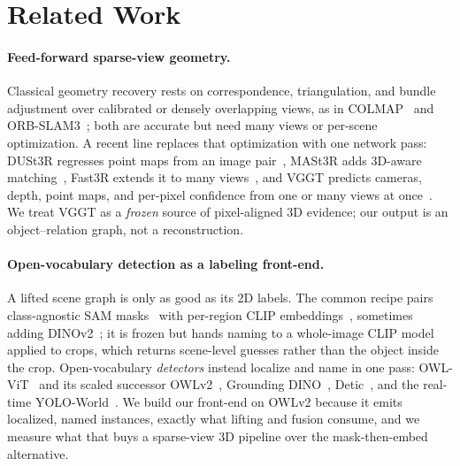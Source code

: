 \section{Related Work}
\label{sec:related_work}

\paragraph{Feed-forward sparse-view geometry.}
Classical geometry recovery rests on correspondence, triangulation, and bundle adjustment over calibrated or densely overlapping views, as in COLMAP~\cite{schonberger2016sfm} and ORB-SLAM3~\cite{campos2021orbslam3}; both are accurate but need many views or per-scene optimization. A recent line replaces that optimization with one network pass: DUSt3R regresses point maps from an image pair~\cite{wang2024dust3r}, MASt3R adds 3D-aware matching~\cite{leroy2024mast3r}, Fast3R extends it to many views~\cite{yang2025fast3r}, and VGGT predicts cameras, depth, point maps, and per-pixel confidence from one or many views at once~\cite{wang2025vggt}. We treat VGGT as a \emph{frozen} source of pixel-aligned 3D evidence; our output is an object--relation graph, not a reconstruction.

\paragraph{Open-vocabulary detection as a labeling front-end.}
A lifted scene graph is only as good as its 2D labels. The common recipe pairs class-agnostic SAM masks~\cite{kirillov2023segment} with per-region CLIP embeddings~\cite{radford2021clip}, sometimes adding DINOv2~\cite{oquab2023dinov2}; it is frozen but hands naming to a whole-image CLIP model applied to crops, which returns scene-level guesses rather than the object inside the crop. Open-vocabulary \emph{detectors} instead localize and name in one pass: OWL-ViT~\cite{minderer2022owlvit} and its scaled successor OWLv2~\cite{minderer2023owlv2}, Grounding DINO~\cite{liu2024groundingdino}, Detic~\cite{zhou2022detic}, and the real-time YOLO-World~\cite{cheng2024yoloworld}. We build our front-end on OWLv2 because it emits localized, named instances, exactly what lifting and fusion consume, and we measure what that buys a sparse-view 3D pipeline over the mask-then-embed alternative.

